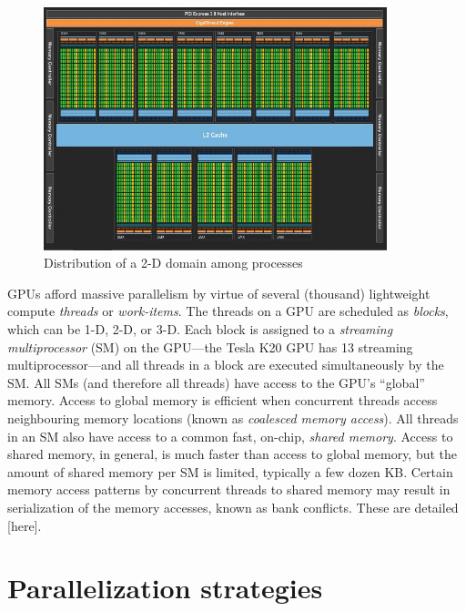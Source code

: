 \documentclass{article}
\begin{document}
    \begin{figure}[h]
    \begin{center}
    \includegraphics[height=200pt]{img/tesla-block-diagram.jpg}
    \end{center}
    \caption{Distribution of a 2-D domain among processes}
    \label{fig:da-domain}
    \end{figure}

    GPUs afford massive parallelism by virtue of several (thousand)
    lightweight compute \emph{threads} or \emph{work-items}.
    The threads on a GPU are scheduled as \emph{blocks},
    which can be 1-D, 2-D, or 3-D.
    Each block is assigned to a \emph{streaming multiprocessor} (SM)
    on the GPU---the Tesla K20 GPU has 13 streaming multiprocessor---and
    all threads in a block are executed simultaneously by the SM.
    All SMs (and therefore all threads) have access to the GPU's ``global'' memory.
    Access to global memory is efficient when concurrent threads
    access neighbouring memory locations
    (known as \emph{coalesced memory access}).
    All threads in an SM also have access to a common fast, on-chip, \emph{shared memory}.
    Access to shared memory, in general, is much faster than access to global memory,
    but the amount of shared memory per SM is limited, typically a few dozen KB.
    Certain memory access patterns by concurrent threads to shared memory may result in
    serialization of the memory accesses, known as bank conflicts. These are detailed [here].

\section{Parallelization strategies}
\end{document}
